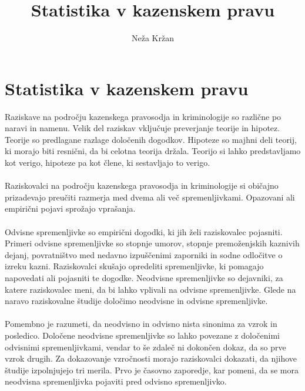 \documentclass[12pt,a4paper]{amsart}
\theoremstyle{definition} %
\theoremstyle{plain} %
\begin{document}
\title{Statistika v kazenskem pravu}
\author{Neža Kržan}
\maketitle

\section{Statistika v kazenskem pravu}
Raziskave na področju kazenskega pravosodja in kriminologije so različne po naravi in namenu. Velik del raziskav vključuje preverjanje teorije in hipotez. 
Teorije so predlagane razlage določenih dogodkov. Hipoteze so majhni deli teorij, ki morajo biti resnični, da bi celotna teorija držala. Teorijo 
si lahko predstavljamo kot verigo, hipoteze pa kot člene, ki sestavljajo to verigo.\\\\
Raziskovalci na področju kazenskega pravosodja in kriminologije si običajno prizadevajo preučiti razmerja med dvema ali več spremenljivkami. Opazovani 
ali empirični pojavi sprožajo vprašanja.\\\\
Odvisne spremenljivke so empirični dogodki, ki jih želi raziskovalec pojasniti. Primeri odvisne spremenljivke so stopnje umorov, stopnje premoženjskih 
kaznivih dejanj, povratništvo med nedavno izpuščenimi zaporniki in sodne odločitve o izreku kazni. Raziskovalci skušajo opredeliti spremenljivke, 
ki pomagajo napovedati ali pojasniti te dogodke. Neodvisne spremenljivke so dejavniki, za katere raziskovalec meni, da bi lahko vplivali na odvisne 
spremenljivke. Glede na naravo raziskovalne študije določimo neodvisne in odvisne spremenljivke.\\\\
Pomembno je razumeti, da neodvisno in odvisno nista sinonima za vzrok in posledico. Določene neodvisne spremenljivke so lahko povezane z določenimi 
odvisnimi spremenljivkami, vendar to še zdaleč ni dokončen dokaz, da so prve vzrok drugih. Za dokazovanje vzročnosti morajo raziskovalci dokazati, 
da njihove študije izpolnjujejo tri merila. Prvo je časovno zaporedje, kar pomeni, da se mora neodvisna spremenljivka pojaviti pred odvisno spremenljivko. 
\end{document}

